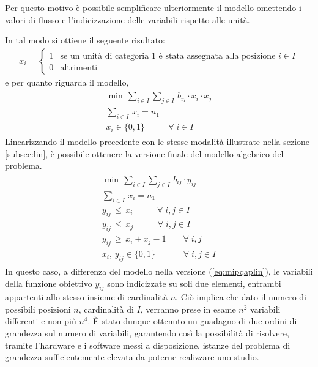 Per questo motivo è possibile semplificare ulteriormente il modello omettendo i valori di flusso e l'indicizzazione delle variabili 
rispetto alle unità. 

\newpage \noindent
In tal modo si ottiene il seguente risultato:
\begin{align*}
    x_{i} = \begin{cases}  1 & \mbox{se un unità di categoria 1} \mbox{ è stata assegnata alla posizione } i \in I\\ 0 & \mbox{altrimenti} \end{cases}
\end{align*}
e per quanto riguarda il modello,
\begin{align*}
	\begin{array}{l}
      \min \, \sum_{i\in I} \sum_{j\in I} \, b_{ij}\cdot x_{i}\cdot x_{j} \\
      \sum_{i\in I} \, x_{i} = n_1 \\
      x_{i} \in \{0,1\}           \;\;\,\qquad \forall \; i \in I
    \end{array}
\end{align*}
Linearizzando il modello precedente con le stesse modalità illustrate nella sezione \ref{subsec:lin}, è possibile ottenere la versione 
finale del modello algebrico del problema.
\begin{align}
    \label{eq:mipqapfinal}
	\begin{array}{l}
      \min \, \sum_{i\in I} \sum_{j\in I} \, b_{ij}\cdot y_{ij} \\
      \sum_{i\in I} \, x_{i} = n_1 \\
      y_{ij} \, \leq \, x_{i}   \;\;\;\qquad \forall \; i,j \in I \\ 
      y_{ij} \, \leq \, x_{j}   \;\;\;\qquad \forall \; i,j \in I \\
      y_{ij} \, \geq \, x_{i} + x_{j} - 1      \qquad \forall \; i,j \\
      x_{i} ,\, y_{ij} \in \{0,1\}      \;\quad\qquad \forall \; i,j \in I
    \end{array}
\end{align}
In questo caso, a differenza del modello nella versione (\ref{eq:mipqaplin}), le variabili della funzione obiettivo $y_{ij}$ sono 
indicizzate su soli due elementi, entrambi appartenti allo stesso insieme di cardinalità $n$. Ciò implica che dato il numero di possibili posizioni $n$, 
cardinalità di $I$, verranno  prese in esame $n^2$ variabili differenti e non più $n^4$. È stato dunque ottenuto un guadagno di due ordini di grandezza sul numero 
di variabili, garantendo così la possibilità di risolvere, tramite l'hardware e i software messi a disposizione, istanze del problema di grandezza 
sufficientemente elevata da poterne realizzare uno studio.


